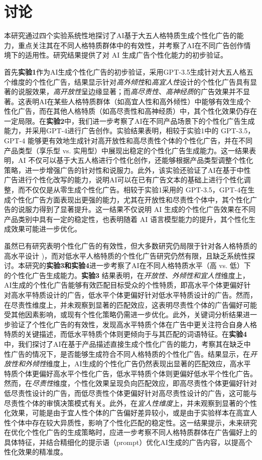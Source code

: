 \section{讨论}
本研究通过四个实验系统性地探讨了AI基于大五人格特质生成个性化广告的能力，重点关注其在不同人格特质群体中的有效性，并考察了AI在不同广告创作情境下的适用性。研究结果提供了对 AI 生成广告个性化能力的初步验证。

首先\textbf{实验1}作为AI生成个性化广告的初步验证，采用GPT-3.5生成针对大五人格五个维度的个性化广告，结果显示针对\textit{高外倾性}和\textit{高宜人性}设计的个性化广告具有显著的说服效果，\textit{高开放性}呈边缘显著；而\textit{高尽责性}、\textit{高神经质}的广告效果并不显著。这表明AI在某些人格特质群体（如高宜人性和高外倾性）中能够有效生成个性化广告，而在其他人格特质（如高尽责性和高神经质）中，其个性化效果仍存在一定局限。在\textbf{实验2}中，我们进一步考察了AI在不同产品场景下的个性化广告生成能力，并采用GPT-4进行广告创作。实验结果表明，相较于实验1中的 GPT-3.5，GPT-4 能够更有效地生成针对高开放性和高尽责性个体的个性化广告，并在不同产品类型（享乐型 vs. 实用型）中展现出稳定的个性化广告生成能力。这一结果表明，AI 不仅可以基于大五人格进行个性化创作，还能够根据产品类型调整个性化策略，进一步增强广告的针对性和说服力。此外，该实验还验证了AI在基于中性广告进行个性化改写的能力，说明AI可以在已有广告文本的基础上进行个性化调整，而不仅仅是从零生成个性化广告。相较于实验1采用的 GPT-3.5，GPT-4在生成个性化广告方面表现出更强的能力，尤其在开放性和尽责性个体中，其个性化广告的说服力得到了显著提升。这一结果不仅说明 AI 生成的个性化广告效果在不同产品类别中具有一定的稳定性，也表明随着 AI 语言模型能力的提升，其个性化生成效果可能进一步优化。

虽然已有研究表明个性化广告的有效性，但大多数研究仍局限于针对各人格特质的高水平设计 \citep[如][]{hirsh2012personalized,matz2017psychological,winter2021effects})，而对低水平人格特质的个性化广告研究仍然有限，且缺乏系统性探讨。本研究的\textbf{实验3和实验4}进一步考察了AI在不同人格特质水平（高 vs. 低）下的个性化广告生成能力。\textbf{实验3} 结果表明，在\textit{开放性、外倾性和宜人性}维度上，AI生成的个性化广告能够有效匹配目标受众的个性特质，即高水平个体更偏好针对高水平特质设计的广告，低水平个体更偏好针对低水平特质设计的广告。然而，在尽责性维度上，并未观察到显著的匹配效应，这表明尽责性个体的广告偏好可能受其他因素影响，或现有个性化策略仍需进一步优化。此外，关键词分析结果进一步验证了个性化广告的有效性，发现高水平特质个体在广告中更关注符合自身人格特质的关键描述，而低水平特质个体则更倾向于与其匹配的词语特征。在\textbf{实验4}中，我们探讨了AI在基于产品描述直接生成个性化广告的能力，考察其在缺乏中性广告的情况下，是否能够生成符合不同人格特质的个性化广告。结果显示，在\textit{开放性和外倾性}维度上，AI生成的个性化广告仍然表现出显著的匹配效应，高水平特质个体更偏好高水平个性化广告，低水平特质个体则更偏好低水平个性化广告。然而，在\textit{尽责性}维度，个性化效果呈现负向匹配效应，即高尽责性个体更偏好针对低尽责性设计的广告，而低尽责性个体更偏好针对高尽责性设计的广告，这可能与尽责性个体的审慎决策模式有关。此外，在\textit{宜人性维度}上，并未观察到显著的个性化效果，可能是由于宜人性个体的广告偏好差异较小，或是由于实验样本在高宜人性个体中存在较大异质性，影响了个性化匹配的稳定性。这一结果提示，未来研究在优化个性化广告的生成策略时，应进一步考察不同人格特质群体在广告偏好上的具体特征，并结合精细化的提示语（prompt）优化AI生成的广告内容，以提高个性化效果的精准度。

